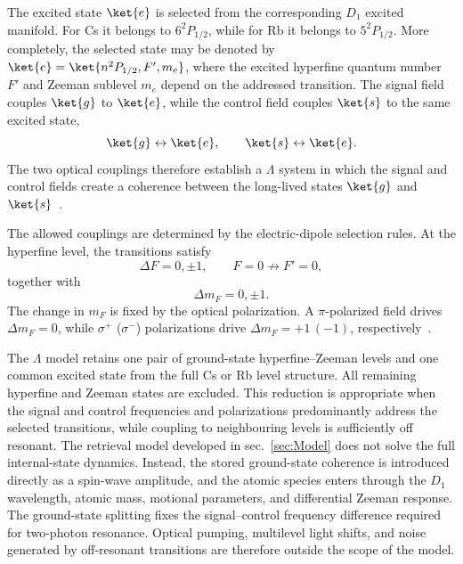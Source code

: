 The excited state $\ket{e}$ is selected from the corresponding $D_1$ excited manifold. For Cs it belongs to $6^2P_{1/2}$, while for Rb it belongs to $5^2P_{1/2}$. More completely, the selected state may be denoted by $\ket{e}=\ket{n^2P_{1/2},F',m_e}$, where the excited hyperfine quantum number $F'$ and Zeeman sublevel $m_e$ depend on the addressed transition. The signal field couples $\ket{g}$ to $\ket{e}$, while the control field couples $\ket{s}$ to the same excited state,
\begin{equation}
\ket{g}
\leftrightarrow
\ket{e},
\qquad
\ket{s}
\leftrightarrow
\ket{e}.
\label{eq:lambda_transitions}
\end{equation}
The two optical couplings therefore establish a $\Lambda$ system in which the signal and control fields create a coherence between the long-lived states $\ket{g}$ and $\ket{s}$~\cite{Apgteitiav_FinkelsteinEtAl_2023,Oqmboeit_MaEtAl_2017}.

The allowed couplings are determined by the electric-dipole selection rules. At the hyperfine level, the transitions satisfy~\cite{CsDataLineSteck,RbDataLineSteck}
\begin{equation}
\Delta F
=
0,\pm1,
\qquad
F=0
\not\rightarrow
F'=0,
\label{eq:selection_rule_F}
\end{equation}
together with
\begin{equation}
\Delta m_F
=
0,\pm1.
\label{eq:selection_rule_mF}
\end{equation}
The change in $m_F$ is fixed by the optical polarization. A $\pi$-polarized field drives $\Delta m_F=0$, while $\sigma^{+}$ ($\sigma^{-}$) polarizations drive $\Delta m_F=+1\, (-1)$, respectively~\cite{CsDataLineSteck,RbDataLineSteck,Apgteitiav_FinkelsteinEtAl_2023}.

The $\Lambda$ model retains one pair of ground-state hyperfine--Zeeman levels and one common excited state from the full Cs or Rb level structure. All remaining hyperfine and Zeeman states are excluded. This reduction is appropriate when the signal and control frequencies and polarizations predominantly address the selected transitions, while coupling to neighbouring levels is sufficiently off resonant. The retrieval model developed in sec.~\ref{sec:Model} does not solve the full internal-state dynamics. Instead, the stored ground-state coherence is introduced directly as a spin-wave amplitude, and the atomic species enters through the $D_1$ wavelength, atomic mass, motional parameters, and differential Zeeman response. The ground-state splitting fixes the signal--control frequency difference required for two-photon resonance. Optical pumping, multilevel light shifts, and noise generated by off-resonant transitions are therefore outside the scope of the model.

